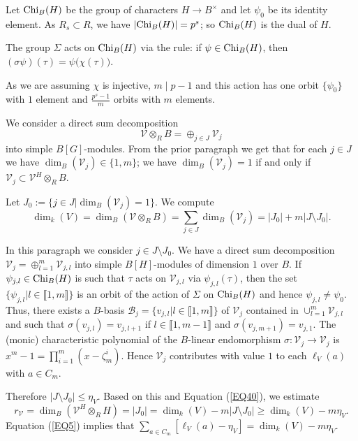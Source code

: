 \documentclass[11pt]{amsart}
\def\Chi{\textup{Chi}}
\begin{document}
Let $\Chi_B(H)$ be the group of characters $H\rightarrow B^{\times}$ and let $\psi_0$ be its identity element. As $R_s\subset R$, we have $|\Chi_B(H)|=p^s$; so $\Chi_B(H)$ is the dual of $H$. 

The group $\Sigma$ acts on $\Chi_B(H)$ via the rule: if $\psi\in\Chi_B(H)$, then $(\sigma\psi)(\tau)=\psi\bigl(\chi(\tau)\bigr)$. 

As we are assuming $\chi$ is injective, $m\mid p-1$ and this action has one orbit $\{\psi_0\}$ with $1$ element and $\frac{p^s-1}{m}$ orbits with $m$ elements.

We consider a direct sum decomposition 
$$\mathcal V\otimes_{R} B=\oplus_{j\in J} \mathcal V_j$$ 
into simple $B[G]$-modules. From the prior paragraph we get that for each $j\in J$ we have $\dim_{B}(\mathcal V_j)\in\{1,m\}$; we have $\dim_{B}(\mathcal V_j)=1$ if and only if  $\mathcal V_j\subset\mathcal V^H\otimes_R B$. 

Let $J_0:=\{j\in J|\dim_{B}(\mathcal V_j)=1\}$. We compute
\begin{equation}\label{EQ40}
\dim_k(V)=\dim_B(\mathcal V\otimes_R B)=\sum_{j\in J} \dim_B(\mathcal V_j)=|J_0|+m|J\setminus J_0|.
\end{equation}

In this paragraph we consider $j\in J\setminus J_0$. We have a direct sum decomposition $\mathcal V_j=\oplus_{l=1}^m \mathcal V_{j,l}$ into simple $B[H]$-modules of dimension $1$ over $B$. If $\psi_{j,l}\in\Chi_B(H)$ is such that $\tau$ acts on $\mathcal V_{j,l}$ via $\psi_{j,l}(\tau)$, then the set $\{\psi_{j,l}|l\in\llbracket1,m\rrbracket\}$ is an orbit of the action of $\Sigma$ on $\Chi_B(H)$ and hence $\psi_{j,l}\neq\psi_0$. Thus, there exists a $B$-basis $\mathcal B_j=\{v_{j,l}|l\in\llbracket1,m\rrbracket\}$ of $\mathcal V_j$ contained in $\cup_{l=1}^m \mathcal V_{j,l}$ and such that $\sigma(v_{j,l})=v_{j,l+1}$ if $l\in\llbracket1,m-1\rrbracket$ and $\sigma(v_{j,m+1})=v_{j,1}$. The (monic) characteristic polynomial of the $B$-linear endomorphism $\sigma:\mathcal V_{j}\rightarrow\mathcal V_j$ is $x^m-1=\prod_{i=1}^m (x-\zeta_m^i)$. Hence $\mathcal V_j$ contributes with value $1$ to each $\ell_V(a)$ with $a\in C_m$. 

Therefore $|J\setminus J_0|\le\eta_V$. Based on this and Equation (\ref{EQ40}), we estimate
\begin{equation}\label{EQ41}
r_{\mathcal V}=\dim_B(\mathcal V^H\otimes_R H)=|J_0|=\dim_k(V)-m|J\setminus J_0|\ge \dim_k(V)-m\eta_V.
\end{equation}
Equation (\ref{EQ5}) implies that $\sum_{a\in C_m} [\ell_V(a)-\eta_V]=\dim_k(V)-m\eta_V$. 
\end{document}
